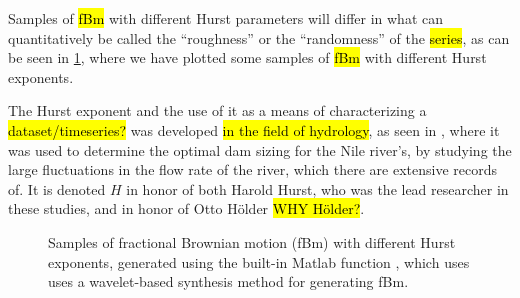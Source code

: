 Samples of \hl{fBm} with different Hurst parameters will differ in what can quantitatively be called the ``roughness'' or the ``randomness'' of the \hl{series}, as can be seen in \cref{fig:fBm_examples}, where we have plotted some samples of \hl{fBm} with different Hurst exponents.


The Hurst exponent and the use of it as a means of characterizing a \hl{dataset/timeseries?} was developed \hl{in the field of hydrology}, as seen in \cite{hurst1951longterm,hurst1965longterm}, where it was used to determine the optimal dam sizing for the Nile river's, by studying the large fluctuations in the flow rate of the river, which there are extensive records of. It is denoted $H$ in honor of both Harold Hurst, who was the lead researcher in these studies, and in honor of Otto H\"older \hl{WHY H\"older?}.
%
%
%
%
\begin{figure}[htpb]%
    \centering%
    {%
        \newcommand{\sa}{H $\approx$ }%
    }%
    \caption{%
        Samples of fractional Brownian motion (fBm) with different Hurst exponents, generated using the built-in Matlab function , which uses uses a wavelet-based synthesis method\cite{abry1996wavelet} for generating fBm.%
    }%
    \label{fig:fBm_examples}%
\end{figure}%
%
%
%
%
%
